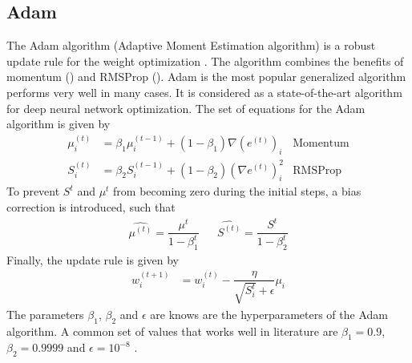 \subsection*{Adam}
The Adam algorithm (Adaptive Moment Estimation algorithm) is a robust update rule for the weight optimization \cite{Kingma2014}. The algorithm combines the benefits of momentum () and RMSProp (). Adam is the most popular generalized algorithm performs very well in many cases. It is considered as a state-of-the-art algorithm for deep neural network optimization. The set of equations for the Adam algorithm is given by
\begin{align}
    \nonumber
    \mu^{(t)}_i &= \beta_1 {\mu}^{(t-1)}_i + (1-\beta_1)\nabla(e^{(t)})_i &\text{Momentum} \\
    \nonumber
    {S}^{(t)}_i &= \beta_2 {S}^{(t-1)}_i + (1-\beta_2)(\nabla e^{(t)})_i^2 &\text{RMSProp}    
\end{align}
To prevent $S^t$ and $\mu^t$ from becoming zero during the initial steps, a bias correction is introduced, such that
\begin{align*}
    \hat{\mu^{(t)}} = \dfrac{\mu^{t}}{1-\beta_1^t} & & \hat{S^{(t)}} = \dfrac{S^t}{1-\beta_2^t}
\end{align*}
Finally, the update rule is given by
\begin{align}
    \label{eq:Adam_def}
    {w}^{(t+1)}_i &= {w}^{(t)}_i - \dfrac{\eta}{\sqrt{S^t_i} + \epsilon}\mu_i
\end{align}
The parameters $\beta_1$, $\beta_2$ and $\epsilon$ are knows are the hyperparameters of the Adam algorithm. A common set of values that works well in literature are $\beta_1 = 0.9$, $\beta_2 = 0.9999$ and $\epsilon = 10^{-8}$ \cite{Kingma2014}.
